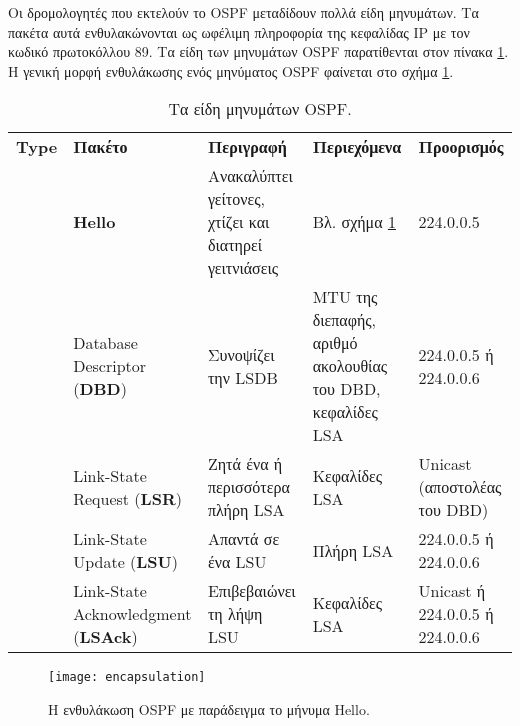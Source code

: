 \documentclass{EdipyLabs} %
\begin{document}
Οι δρομολογητές που εκτελούν το OSPF μεταδίδουν πολλά είδη μηνυμάτων. Τα πακέτα αυτά ενθυλακώνονται ως ωφέλιμη πληροφορία της κεφαλίδας IP με τον κωδικό πρωτοκόλλου 89. Τα είδη των μηνυμάτων OSPF παρατίθενται στον πίνακα \ref{tab:messages}. H γενική μορφή ενθυλάκωσης ενός μηνύματος OSPF φαίνεται στο σχήμα \ref{fig:encapsulation}.

\begin{table}[ht]\renewcommand\arraystretch{1.35}\small
	\centering	{}
	\begin{tabular}{>{\centering}lm{3cm}m{4cm}m{4.0cm}m{3cm}}\FormatFirstRow
\textbf{Type}	& \textbf{Πακέτο}							 & \textbf{Περιγραφή}  										& \textbf{Περιεχόμενα} 										 & \textbf{Προορισμός}		\\
		1		& \textbf{Hello} 							 & Ανακαλύπτει γείτονες, χτίζει και διατηρεί γειτνιάσεις	& Βλ. σχήμα \ref{fig:encapsulation}							 & 224.0.0.5	\\
		2		& Database Descriptor (\textbf{DBD})		 & Συνοψίζει την LSDB								    	& MTU της διεπαφής, αριθμό ακολουθίας του DBD, κεφαλίδες LSA & 224.0.0.5 ή 224.0.0.6 \\
		3		& Link-State Request (\textbf{LSR})			 & Ζητά ένα ή περισσότερα πλήρη LSA							& Κεφαλίδες LSA												 & Unicast (αποστολέας του DBD) \\
		4		& Link-State Update (\textbf{LSU})			 & Απαντά σε ένα LSU										& Πλήρη LSA													 & 224.0.0.5 ή 224.0.0.6 \\
		5		& Link-State Acknowledgment (\textbf{LSAck}) & Επιβεβαιώνει τη λήψη LSU 								& Κεφαλίδες LSA 											& Unicast ή 224.0.0.5 ή 224.0.0.6
	\end{tabular}
	\caption{Τα είδη μηνυμάτων OSPF.}\label{tab:messages}
\end{table}

\begin{figure}[ht]
	\centering
	\texttt{[image: encapsulation]}
	\caption{Η ενθυλάκωση OSPF με παράδειγμα το μήνυμα Hello.}\label{fig:encapsulation}
\end{figure}
\end{document}
